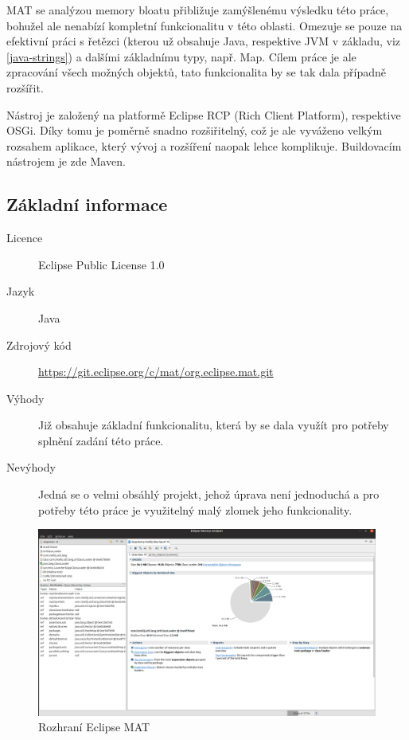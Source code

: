 MAT se analýzou memory bloatu přibližuje zamýšlenému výsledku této práce, bohužel ale nenabízí kompletní funkcionalitu v této oblasti. Omezuje se pouze na efektivní práci s řetězci (kterou už obsahuje Java, respektive JVM v základu, viz \ref{java-strings}) a dalšími základnímu typy, např. Map. Cílem práce je ale zpracování všech možných objektů, tato funkcionalita by se tak dala případně rozšířit.

Nástroj je založený na platformě Eclipse RCP (Rich Client Platform), respektive OSGi. Díky tomu je poměrně snadno rozšiřitelný, což je ale vyváženo velkým rozsahem aplikace, který vývoj a rozšíření naopak lehce komplikuje. Buildovacím nástrojem je zde Maven.

\subsection{Základní informace}

\begin{description}
    \item[Licence] Eclipse Public License 1.0
    \item[Jazyk] Java
    \item[Zdrojový kód] \url{https://git.eclipse.org/c/mat/org.eclipse.mat.git} 
    \item[Výhody] Již obsahuje základní funkcionalitu, která by se dala využít pro potřeby splnění zadání této práce.
    \item[Nevýhody] Jedná se o velmi obsáhlý projekt, jehož úprava není jednoduchá a pro potřeby této práce je využitelný malý zlomek jeho funkcionality.
\end{description}

\begin{figure}[ht!]
	\centering
	\includegraphics[scale=0.3]{obrazky/mat.png}
	\caption{Rozhraní Eclipse MAT}
	\label{obr-eclipse-mat}
\end{figure}


